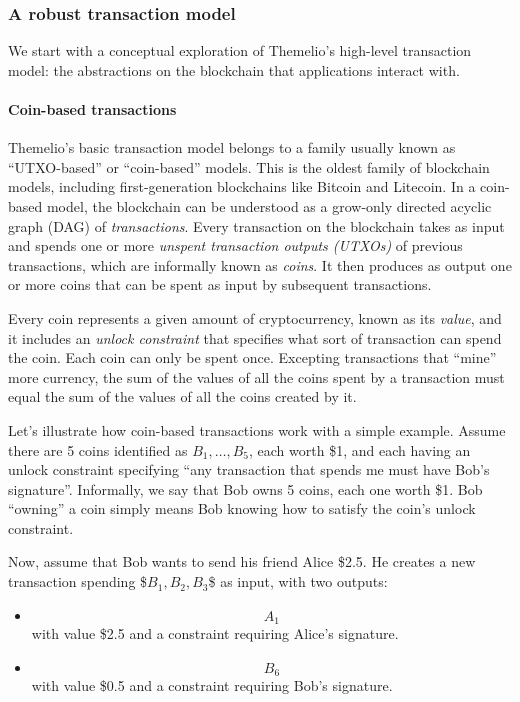 \documentclass[]{article}
\providecommand{\tightlist}{%
  \setlength{\itemsep}{0pt}\setlength{\parskip}{0pt}}
\let\oldparagraph\paragraph
\renewcommand{\paragraph}[1]{\oldparagraph{#1}\mbox{}}
\begin{document}
\hypertarget{a-robust-transaction-model}{%
\subsubsection{A robust transaction
model}\label{a-robust-transaction-model}}

We start with a conceptual exploration of Themelio's high-level
transaction model: the abstractions on the blockchain that applications
interact with.

\hypertarget{coin-based-transactions}{%
\paragraph{Coin-based transactions}\label{coin-based-transactions}}

Themelio's basic transaction model belongs to a family usually known as
``UTXO-based'' or ``coin-based'' models. This is the oldest family of
blockchain models, including first-generation blockchains like Bitcoin
and Litecoin. In a coin-based model, the blockchain can be understood as
a grow-only directed acyclic graph (DAG) of \emph{transactions}. Every
transaction on the blockchain takes as input and spends one or more
\emph{unspent transaction outputs (UTXOs)} of previous transactions,
which are informally known as \emph{coins}. It then produces as output
one or more coins that can be spent as input by subsequent transactions.

Every coin represents a given amount of cryptocurrency, known as its
\emph{value}, and it includes an \emph{unlock constraint} that specifies
what sort of transaction can spend the coin. Each coin can only be spent
once. Excepting transactions that ``mine'' more currency, the sum of the
values of all the coins spent by a transaction must equal the sum of the
values of all the coins created by it.

Let's illustrate how coin-based transactions work with a simple example.
Assume there are 5 coins identified as \(B_1,\dots,B_{5}\), each worth
\$1, and each having an unlock constraint specifying ``any transaction
that spends me must have Bob's signature''. Informally, we say that Bob
owns 5 coins, each one worth \$1. Bob ``owning'' a coin simply means Bob
knowing how to satisfy the coin's unlock constraint.

Now, assume that Bob wants to send his friend Alice \$2.5. He creates a
new transaction spending \$\(B_1,B_2,B_3\)\$ as input, with two outputs:

\begin{itemize}
\tightlist
\item
  \[A_1\] with value \$2.5 and a constraint requiring Alice's signature.
\item
  \[B_6\] with value \$0.5 and a constraint requiring Bob's signature.
\end{itemize}
\end{document}

